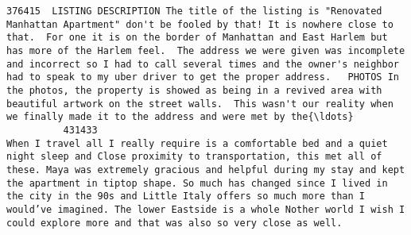 \documentclass[11pt]{article}
\begin{document}
\begin{Verbatim}[commandchars=\\\{\}]
          376415  LISTING DESCRIPTION The title of the listing is "Renovated Manhattan Apartment" don't be fooled by that! It is nowhere close to that.  For one it is on the border of Manhattan and East Harlem but has more of the Harlem feel.  The address we were given was incomplete and incorrect so I had to call several times and the owner's neighbor had to speak to my uber driver to get the proper address.   PHOTOS In the photos, the property is showed as being in a revived area with beautiful artwork on the street walls.  This wasn't our reality when we finally made it to the address and were met by the{\ldots}   
          431433                                                                                                                                     When I travel all I really require is a comfortable bed and a quiet night sleep and Close proximity to transportation, this met all of these. Maya was extremely gracious and helpful during my stay and kept the apartment in tiptop shape. So much has changed since I lived in the city in the 90s and Little Italy offers so much more than I would’ve imagined. The lower Eastside is a whole Nother world I wish I could explore more and that was also so very close as well.   
          

\end{Verbatim}
\end{document}
